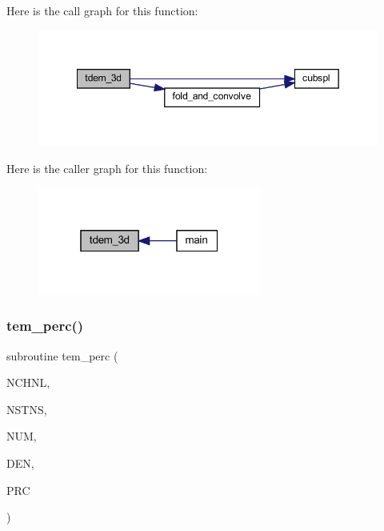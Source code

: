 Here is the call graph for this function\+:
\nopagebreak
\begin{figure}[H]
\begin{center}
\leavevmode
\includegraphics[width=349pt]{Marco_8f90_afe01227236073e58a677de51fccb36ba_cgraph}
\end{center}
\end{figure}
Here is the caller graph for this function\+:
\nopagebreak
\begin{figure}[H]
\begin{center}
\leavevmode
\includegraphics[width=208pt]{Marco_8f90_afe01227236073e58a677de51fccb36ba_icgraph}
\end{center}
\end{figure}
\mbox{\label{Marco_8f90_a130e19214a557786f1a455a211b9c738}} 
\subsubsection{\texorpdfstring{tem\+\_\+perc()}{tem\_perc()}}
{\footnotesize\ttfamily subroutine tem\+\_\+perc (\begin{DoxyParamCaption}\item[{integer, intent(in)}]{N\+C\+H\+NL,  }\item[{integer, intent(in)}]{N\+S\+T\+NS,  }\item[{real, dimension(nchnl, nstns), intent(in)}]{N\+UM,  }\item[{real, dimension(nchnl, nstns), intent(in)}]{D\+EN,  }\item[{real, dimension(nchnl, nstns), intent(out)}]{P\+RC }\end{DoxyParamCaption})}

